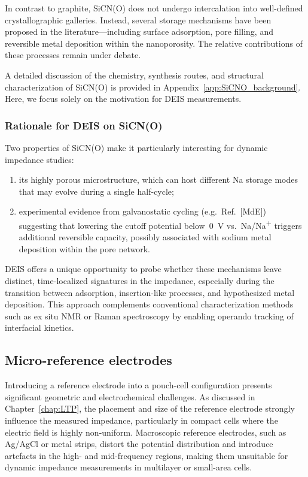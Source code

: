 In contrast to graphite, SiCN(O) does not undergo intercalation into well-defined crystallographic galleries.  
Instead, several storage mechanisms have been proposed in the literature—including surface adsorption, pore filling, and reversible metal deposition within the nanoporosity.  
The relative contributions of these processes remain under debate.

A detailed discussion of the chemistry, synthesis routes, and structural characterization of SiCN(O) is provided in Appendix~\ref{app:SiCNO_background}.  
Here, we focus solely on the motivation for DEIS measurements.

\subsubsection{Rationale for DEIS on SiCN(O)}

Two properties of SiCN(O) make it particularly interesting for dynamic impedance studies:
\begin{enumerate}
    \item its highly porous microstructure, which can host different Na storage modes that may evolve during a single half-cycle;
    \item experimental evidence from galvanostatic cycling (e.g.\ Ref.~[MdE]) suggesting that lowering the cutoff potential below~0~V vs.\ Na/Na\textsuperscript{+} triggers additional reversible capacity, possibly associated with sodium metal deposition within the pore network.
\end{enumerate}

DEIS offers a unique opportunity to probe whether these mechanisms leave distinct, time-localized signatures in the impedance, especially during the transition between adsorption, insertion-like processes, and hypothesized metal deposition.  
This approach complements conventional characterization methods such as ex situ NMR or Raman spectroscopy by enabling operando tracking of interfacial kinetics.

\subsection{Micro-reference electrodes}

Introducing a reference electrode into a pouch-cell configuration presents significant geometric and electrochemical challenges.  
As discussed in Chapter~\ref{chap:LTP}, the placement and size of the reference electrode strongly influence the measured impedance, particularly in compact cells where the electric field is highly non-uniform.  
Macroscopic reference electrodes, such as Ag/AgCl or metal strips, distort the potential distribution and introduce artefacts in the high- and mid-frequency regions, making them unsuitable for dynamic impedance measurements in multilayer or small-area cells.

